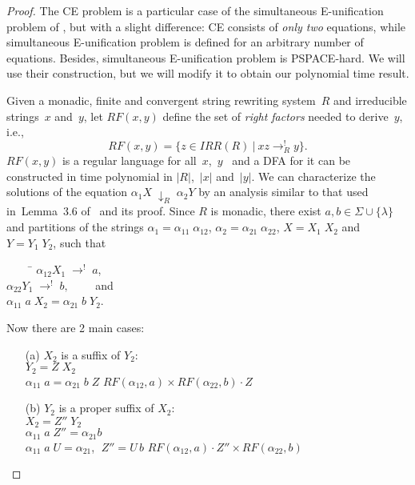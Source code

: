 \documentclass{lmcs} %
\theoremstyle{plain}\newtheorem{satz}[thm]{Satz} %
\begin{document}
\begin{proof}
  The CE problem is a particular case of the simultaneous
  E-unification problem of \cite{OND98}, but with a slight
  difference: CE consists of \emph{only two} equations, while
  simultaneous E-unification problem is defined for an arbitrary
  number of equations.  Besides, simultaneous E-unification problem is
  PSPACE-hard. We will use their construction, but we will modify
  it to obtain our polynomial time result.
  
Given a monadic, finite and convergent string rewriting system~$R$
and irreducible strings~$x$ and~$y$, let
$RF(x, y)$ define the set of \emph{right factors} needed to derive~$y$, i.e.,
$$RF(x, y) = \{ z \in IRR(R) ~ | ~ xz \rightarrow_R^{!} y \}.$$
$RF(x, y)$ is a regular language for
all~$x$,~$y$~\cite{OND98} and a DFA
for it can be constructed in time polynomial
in $|R|$,~$|x|$ and~$|y|$. 
We can characterize the solutions of the equation
$\alpha_1 X \; \downarrow_R^{} \; \alpha_2 Y$ by an
analysis similar to that used in~Lemma~3.6 of~\cite{OND98}
and its proof. 
Since $R$ is
monadic, there exist $a,b \in \Sigma \cup \{\lambda\}$ and partitions
of the strings $\alpha_1 = {\alpha_{11}} \; {\alpha_{12}}$, $\alpha_2 =
{\alpha_{21}} \; {\alpha_{22}}$, $X = {X_1}\;{X_2}$ and $Y =
{Y_1} \; {Y_2}$, such that 
\begin{tabbing}
$\qquad$ \= $\alpha_{12} X_1 \; \rightarrow_{}^! \; a$,\\
         \> $\alpha_{22} Y_1 \; \rightarrow_{}^! \; b, \qquad$ and \\[+5pt]
         \> ${\alpha_{11}}\; a\; {X_2} = {\alpha_{21}}\; b\; {Y_2}$.\\
\end{tabbing}
Now there are 2 main cases:

\begin{itemize}
\item[(a)] ${X_2}$ is a suffix of ${Y_2}$: \\[+5pt]
 \indent \hspace{12pt} ${Y_2} = Z\; {X_2}$\\
 \indent \hspace{12pt} ${\alpha_{11}}\;a = {\alpha_{21}} \;b\; Z$ \hfill $RF({\alpha_{12}}, a) \times RF({\alpha_{22}}, b) \cdot Z$\\
\item[(b)] ${Y_2}$ is a proper suffix of  ${X_2}$: \\[+5pt]
 \indent \hspace{12pt} ${X_2} = Z''\; {Y_2}$\\
 \indent \hspace{12pt} ${\alpha_{11}} \; a \; Z'' = {\alpha_{21}} b$\\
 \indent \hspace{12pt} ${\alpha_{11}} \; a \; U = {\alpha_{21}}$, $\; Z'' = U\,b$
	\hfill $RF({\alpha_{12}}, a) \cdot Z'' \times RF({\alpha_{22}}, b)$
\end{itemize}


\end{proof}
\end{document}
